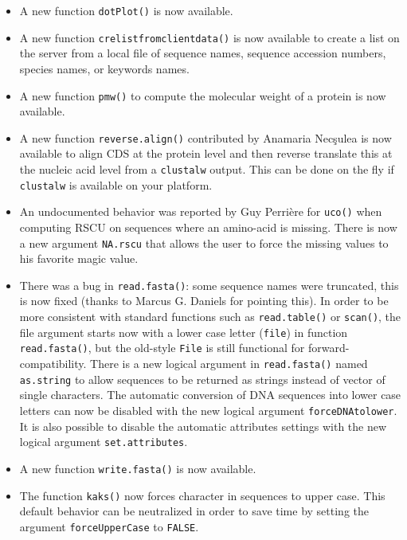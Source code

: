\documentclass{article}
\begin{document}
\begin{itemize}

\item A  new function \texttt{dotPlot()} is now available.

\item A new function \texttt{crelistfromclientdata()} is now available to
create a list on the server from a local file of sequence names, sequence
accession numbers, species names, or keywords names.

\item A new function \texttt{pmw()} to compute the molecular weight of
a protein is now available.

\item A new function \texttt{reverse.align()} contributed by Anamaria Nec\c{s}ulea
is now available to align CDS at the protein level and then reverse translate this at
the nucleic acid level from a \texttt{clustalw} output. This can be done on the fly
if \texttt{clustalw} is available on your platform.

\item An undocumented behavior was reported by Guy Perri{\`e}re for \texttt{uco()}
when computing RSCU on sequences where an amino-acid is missing. There is
now a new argument \texttt{NA.rscu} that allows the user to force the
missing values to his favorite magic value.

\item There was a bug in \texttt{read.fasta()}: some sequence names were
truncated, this is now fixed (thanks to Marcus G. Daniels for pointing this).
In order to be more consistent with standard functions such as \texttt{read.table()}
or \texttt{scan()}, the file argument starts now with a lower case letter (\texttt{file})
in function \texttt{read.fasta()}, but the old-style \texttt{File} is still
functional for forward-compatibility. There is a new logical argument in \texttt{read.fasta()}
named \texttt{as.string} to allow sequences to be returned as strings instead of
vector of single characters. The automatic conversion of DNA sequences into
lower case letters can now be disabled with the new logical argument
\texttt{forceDNAtolower}. It is also possible to disable the automatic attributes
settings with the new logical argument \texttt{set.attributes}.

\item A new function \texttt{write.fasta()} is now available.

\item The function \texttt{kaks()} now forces character in sequences to upper case.
This default behavior can be neutralized in order to save time by setting the 
argument \texttt{forceUpperCase} to \texttt{FALSE}.

\end{itemize}
\end{document}
